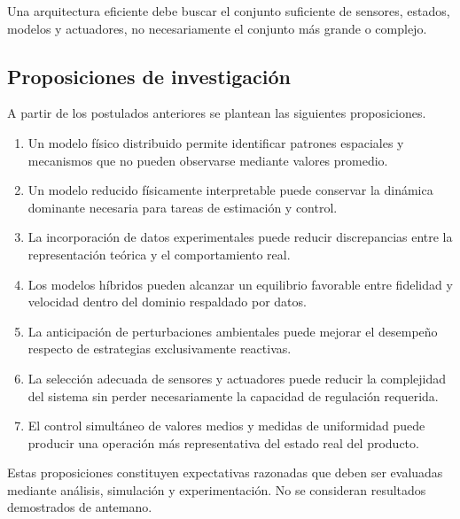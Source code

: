 Una arquitectura eficiente debe buscar el conjunto suficiente de sensores, estados, modelos y actuadores, no necesariamente el conjunto más grande o complejo.

\subsection{Proposiciones de investigación}
\label{subsec:proposiciones_investigacion}

A partir de los postulados anteriores se plantean las siguientes proposiciones.

\begin{enumerate}
    \item Un modelo físico distribuido permite identificar patrones espaciales y mecanismos que no pueden observarse mediante valores promedio.
    
    \item Un modelo reducido físicamente interpretable puede conservar la dinámica dominante necesaria para tareas de estimación y control.
    
    \item La incorporación de datos experimentales puede reducir discrepancias entre la representación teórica y el comportamiento real.
    
    \item Los modelos híbridos pueden alcanzar un equilibrio favorable entre fidelidad y velocidad dentro del dominio respaldado por datos.
    
    \item La anticipación de perturbaciones ambientales puede mejorar el desempeño respecto de estrategias exclusivamente reactivas.
    
    \item La selección adecuada de sensores y actuadores puede reducir la complejidad del sistema sin perder necesariamente la capacidad de regulación requerida.
    
    \item El control simultáneo de valores medios y medidas de uniformidad puede producir una operación más representativa del estado real del producto.
\end{enumerate}

Estas proposiciones constituyen expectativas razonadas que deben ser evaluadas mediante análisis, simulación y experimentación. No se consideran resultados demostrados de antemano.

